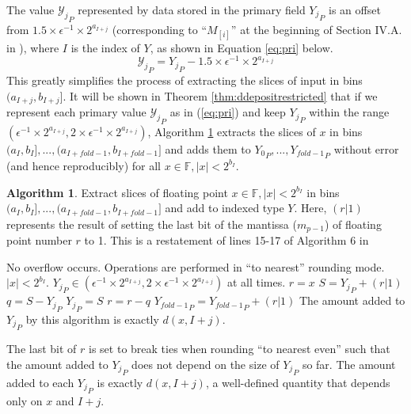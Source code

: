 \documentclass[12pt]{article}
\providecommand{\F}{\ensuremath{\mathbb{F}}}
\providecommand{\To}{\ensuremath{\text{ to }}}
\theoremstyle{definition}
\newtheorem{alg}{Algorithm}[section]
\numberwithin{equation}{section}
\begin{document}
      The value ${\mathcal{Y}_j}_P$ represented by data stored in the primary field ${Y_j}_P$ is an offset from $1.5\times \epsilon^{-1} \times 2^{a_{I + j}}$ (corresponding to ``$M_{[i]}$'' at the beginning of Section IV.A. in \cite{repsum}), where $I$ is the index of $Y$, as shown in Equation \ref{eq:pri} below.
      \begin{equation}
        {\mathcal{Y}_j}_P = {Y_j}_P - 1.5\times\epsilon^{-1}\times2^{a_{I + j}}
        \label{eq:pri}
      \end{equation}
      This greatly simplifies the process of extracting the slices of input in bins $(a_{I + j}, b_{I + j}]$. It will be shown in Theorem \ref{thm:ddepositrestricted} that if we represent each primary value ${\mathcal{Y}_j}_P$ as in (\ref{eq:pri}) and keep ${Y_j}_P$ within the range $(\epsilon^{-1} \times 2^{a_{I + j}}, 2 \times \epsilon^{-1} \times 2^{a_{I + j}})$, Algorithm \ref{alg:depositrestricted} extracts the slices of $x$ in bins $(a_I, b_I], ..., (a_{I + fold - 1}, b_{I + fold - 1}]$ and adds them to ${Y_0}_P, ..., {Y_{fold - 1}}_P$ without error (and hence reproducibly) for all $x \in \F, |x| < 2^{b_I}$.
      \begin{alg}
        Extract slices of floating point $x \in \F, |x| < 2^{b_I}$ in bins $(a_I, b_I], ..., (a_{I + fold - 1}, b_{I + fold - 1}]$ and add to indexed type $Y$. Here, $(r | 1)$ represents the result of setting the last bit of the mantissa ($m_{p - 1}$) of floating point number $r$ to 1. This is a restatement of lines 15-17 of Algorithm $6$ in \cite{repsum}
        \begin{algorithmic}[1]
          \Require
          \Statex No overflow occurs.
          \Statex Operations are performed in ``to nearest'' rounding mode.
          \Statex $|x| < 2^{b_I}$.
          \Statex ${Y_j}_P \in (\epsilon^{-1} \times 2^{a_{I + j}}, 2 \times \epsilon^{-1} \times 2^{a_{I + j}})$ at all times.
            \State $r = x$ \label{alg:depositrestricted:rgetsx}
            \For{$j = 0 \To (fold - 2)$} \label{alg:depositrestricted:loop}
              \State $S = {Y_j}_P + (r | 1)$ \label{alg:depositrestricted:split}
              \State $q = S - {Y_j}_P$
              \State ${Y_j}_P = S$
              \State $r = r - q$\label{alg:depositrestricted:endsplit}
            \EndFor
            \State ${Y_{fold - 1}}_P = {Y_{fold - 1}}_P + (r | 1)$
          \EndFunction
          \Ensure
          \Statex The amount added to ${Y_j}_P$ by this algorithm is exactly $d(x, I + j)$.
        \end{algorithmic}
        \label{alg:depositrestricted}
      \end{alg}
      The last bit of $r$ is set to break ties when rounding ``to nearest even'' such that the amount added to ${Y_j}_P$ does not depend on the size of ${Y_j}_P$ so far. The amount added to each ${Y_j}_P$ is exactly $d(x, I + j)$, a well-defined quantity that depends only on $x$ and $I + j$.
\end{document}
